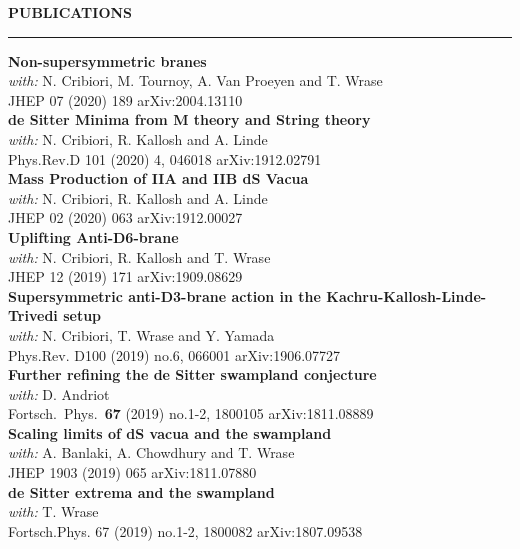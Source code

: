 \documentclass[a4paper,12pt]{report}
\newenvironment{rSection}[1]{ %
  \sectionskip
  \MakeUppercase{\bf #1} %
  \sectionlineskip
  \hrule %
  \begin{list}{}{ %
    \setlength{\leftmargin}{1.5em} %
  }
  \item[]
}{
  \end{list}
}
\def\sectionlineskip{\medskip} %
\def\sectionskip{\medskip} %
\begin{document}
            \newpage
            \begin{rSection}{Publications}
            
            {\bf Non-supersymmetric branes}
            \\\emph{with:} N. Cribiori, M. Tournoy, A. Van Proeyen and T. Wrase
             \\ JHEP 07 (2020) 189 \hfill arXiv:2004.13110\vspace{7pt}
            \\{\bf de Sitter Minima from M theory and String theory}
            \\\emph{with:} N. Cribiori, R. Kallosh and A. Linde
             \\ Phys.Rev.D 101 (2020) 4, 046018 \hfill arXiv:1912.02791\vspace{7pt}
            \\{\bf Mass Production of IIA and IIB dS Vacua}
            \\\emph{with:} N. Cribiori, R. Kallosh and A. Linde
             \\ JHEP 02 (2020) 063 \hfill arXiv:1912.00027\vspace{7pt}
            \\{\bf Uplifting Anti-D6-brane}
            \\\emph{with:} N. Cribiori, R. Kallosh and T. Wrase
             \\ JHEP 12 (2019) 171 \hfill arXiv:1909.08629\vspace{7pt}
             \\{\bf Supersymmetric anti-D3-brane action in the Kachru-Kallosh-Linde-Trivedi setup}
            \\\emph{with:} N. Cribiori, T. Wrase and Y. Yamada
            \\Phys.Rev. D100 (2019) no.6, 066001 \hfill arXiv:1906.07727\vspace{7pt}
            \\{\bf Further refining the de Sitter swampland conjecture}
            \\\emph{with:} D. Andriot 
            \\Fortsch.\ Phys.\  {\bf 67} (2019) no.1-2,  1800105 \hfill arXiv:1811.08889\vspace{7pt}
            \\{\bf Scaling limits of dS vacua and the swampland}
            \\\emph{with:} A. Banlaki, A. Chowdhury and T. Wrase
            \\JHEP 1903 (2019) 065 \hfill arXiv:1811.07880\vspace{7pt}
            \\{\bf de Sitter extrema and the swampland}
            \\\emph{with:} T. Wrase
            \\Fortsch.Phys. 67 (2019) no.1-2, 1800082 \hfill arXiv:1807.09538
            
            \end{rSection}
            
\end{document}
